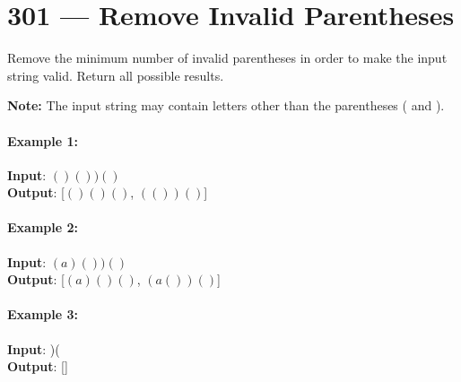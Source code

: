 \section{301 --- Remove Invalid Parentheses}
Remove the minimum number of invalid parentheses in order to make the input string valid. Return all possible results.
\par
\textbf{Note:} The input string may contain letters other than the parentheses ( and ).

\paragraph{Example 1:}

\begin{flushleft}
\textbf{Input}: $()())()$
\\
\textbf{Output}: [$()()()$, $(())()$]
\\
\end{flushleft}

\paragraph{Example 2:}

\begin{flushleft}
\textbf{Input}: $(a)())()$
\\
\textbf{Output}: [$(a)()()$, $(a())()$]
\end{flushleft}

\paragraph{Example 3:}


\begin{flushleft}
\textbf{Input}: )(
\\
\textbf{Output}: []
\end{flushleft}
